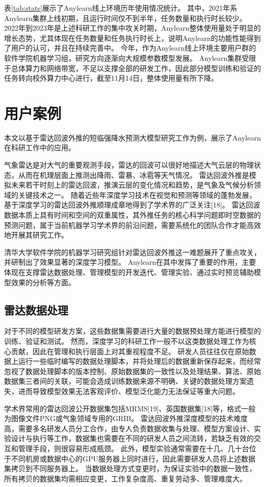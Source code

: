 表\ref{tab:stats}展示了Anylearn线上环境历年使用情况统计。
其中，2021年系Anylearn集群上线初期，且运行时间仅不到半年，任务数量和执行时长较少。
2022年到2023年是上述科研工作的集中攻关时期，Anylearn整体使用量处于明显的增长态势，尤其体现在任务数量和任务执行时长上，说明Anylearn的功能性能得到了用户的认可，并且在持续完善中。
今年，作为Anylearn线上环境主要用户群的软件学院机器学习组，研究方向逐渐向大规模参数模型发展。
Anylearn集群受限于总体算力和网络带宽，不足以支撑全部的研发工作，因此部分模型训练和验证的任务转向校外算力中心进行，截至11月14日，整体使用量有所下降。


\section{用户案例}

本文以基于雷达回波外推的短临强降水预测大模型研究工作为例，展示了Anylearn在科研工作中的应用。

气象雷达是对大气的重要观测手段，雷达的回波可以很好地描述大气云层的物理状态，从而在机理层面上推测出降雨、雷暴、冰雹等天气情况。
雷达回波外推是模拟未来若干时刻上的雷达回波，推演云层的变化情况和趋势，是气象及气候分析领域的关键技术之一。
随着近些年深度学习技术在视觉和预测等领域的蓬勃发展，基于深度学习的雷达回波外推顺理成章地得到了学术界的广泛关注[18]。
雷达回波数据本质上具有时间和空间的双重属性，其外推任务的核心科学问题即时空数据的预测问题，属于当前机器学习学术界的前沿问题，需要系统化的团队合作才能高效地开展其研究工作。

清华大学软件学院的机器学习研究组针对雷达回波外推这一难题展开了重点攻关，并研制出了效果显著的深度学习模型。
Anylearn在其中发挥了重要的作用，主要体现在支撑雷达数据处理、管理模型的开发迭代、管理实验、通过实时预览辅助模型效果的分析等方面。

\subsection{雷达数据处理}
对于不同的模型研发方案，这些数据集需要进行大量的数据预处理方能进行模型的训练、验证和测试。
然而，深度学习的科研工作一般不以这类数据处理工作为核心贡献，因此在管理和执行层面上对其重视程度不足。
研发人员往往仅在原始数据上运行一些临时编写的数据处理脚本，并将处理后的数据重新保存起来，而经常忽视了数据处理脚本的版本控制、原始数据集的一致性以及处理结果、算法、原始数据集三者间的关联，可能会造成训练数据来源不明确、关键的数据处理方案遗失，进而导致模型效果无法客观评价、模型泛化能力无法保证等重大问题。

学术界常用的雷达回波公开数据集包括MRMS[19]、英国数据集[18]等，格式一般为图像文件PNG或气象领域专用的GRIB。
雷达回波外推深度模型的技术难度高，需要多名研发人员分工合作，由专人负责数据收集与处理、模型方案设计、实验设计与执行等工作，数据集也需要在不同的研发人员之间流转，若缺乏有效的交互和管理手段，则很容易形成瓶颈。
此外，模型实验通常需要在十几、几十台位于不同机房或数据中心的GPU服务器上同时进行，因此需要研发人员将上述数据集拷贝到不同服务器上。
当数据处理方式变更时，为保证实验中的数据一致性，所有拷贝的数据集均需相应变更，工作复杂度高、重复劳动多、管理难度大。

